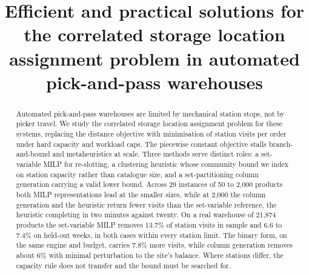 \documentclass[]{interact}
\begin{document}

\title{Efficient and practical solutions for the correlated storage location assignment problem in automated pick-and-pass warehouses}

\author{
}

\maketitle

\begin{abstract}
Automated pick-and-pass warehouses are limited by mechanical station stops, not by picker travel. We study the correlated storage location assignment problem for these systems, replacing the distance objective with minimisation of station visits per order under hard capacity and workload caps. The piecewise constant objective stalls branch-and-bound and metaheuristics at scale. Three methods serve distinct roles: a set-variable MILP for re-slotting, a clustering heuristic whose community bound we index on station capacity rather than catalogue size, and a set-partitioning column generation carrying a valid lower bound. Across 29 instances of 50 to 2,000 products both MILP representations lead at the smaller sizes, while at 2,000 the column generation and the heuristic return fewer visits than the set-variable reference, the heuristic completing in two minutes against twenty. On a real warehouse of 21,874 products the set-variable MILP removes 13.7\% of station visits in sample and 6.6 to 7.4\% on held-out weeks, in both cases within every station limit. The binary form, on the same engine and budget, carries 7.8\% more visits, while column generation removes about 6\% with minimal perturbation to the site's balance. Where stations differ, the capacity rule does not transfer and the bound must be searched for.
\end{abstract}
\end{document}
